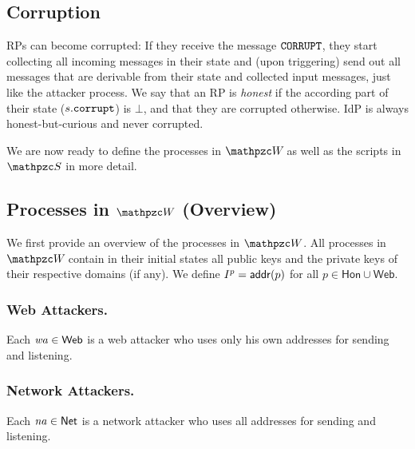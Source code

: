   
  \subsection{Corruption}
  RPs can become corrupted: If they receive the message
  $\mathtt{CORRUPT}$, they start collecting all incoming messages in their state
  and (upon triggering) send out all messages that are derivable from
  their state and collected input messages, just like the attacker
  process. We say that an RP is \emph{honest} if the according
  part of their state ($s.\mathtt{corrupt}$) is $\bot$, and that they are
  corrupted otherwise. IdP is always honest-but-curious and never corrupted.
  
  We are now ready to define the processes in $\websystem$ as well as
  the scripts in $\scriptset$ in more detail. 
  
  \subsection{Processes in $\bidsystem$ (Overview)}
  
  We first provide an overview of the processes in $\bidsystem$. All
  processes in $\websystem$ contain in their initial states all public
  keys and the private keys of their respective domains (if any). We
  define $I^p=\mathsf{addr}(p)$ for all $p\in \mathsf{Hon} \cup \mathsf{Web}$.
  
  \subsubsection{Web Attackers.}  Each $\mathit{wa} \in \mathsf{Web}$  is a
  web attacker who uses only his own addresses for sending and listening. 
  
  \subsubsection{Network Attackers.}  Each $\mathit{na} \in \mathsf{Net}$  is a
  network attacker who uses all addresses for sending and listening. 
  
